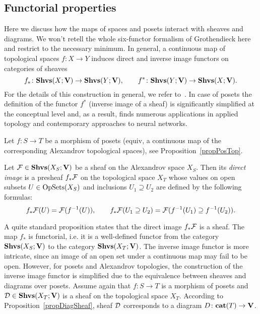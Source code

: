 
\subsection{Functorial properties}\label{subsecMathFunctorial}

Here we discuss how the maps of spaces and posets interact with sheaves and diagrams. We won't retell the whole six-functor formalism of Grothendieck here and restrict to the necessary minimum. In general, a continuous map of topological spaces $f\colon X\to Y$ induces direct and inverse image functors on categories of sheaves
\[
f_*\colon \mathbf{Shvs}(X;\mathbf{V})\to \mathbf{Shvs}(Y;\mathbf{V}), \qquad f^*\colon \mathbf{Shvs}(Y;\mathbf{V})\to \mathbf{Shvs}(X;\mathbf{V}).
\]
For the details of this construction in general, we refer to~\cite{Iversen}. In case of posets the definition of the functor $f^*$ (inverse image of a sheaf) is significantly simplified at the conceptual level and, as a result, finds numerous applications in applied topology and contemporary approaches to neural networks.

Let $f\colon S\to T$ be a morphism of posets (equiv, a continuous map of the corresponding Alexandrov topological spaces), see Proposition~\ref{propPosTop}.

\begin{defin}\label{defDirectImage}
Let $\mathcal{F}\in\mathbf{Shvs}(X_S;\mathbf{V})$ be a sheaf on the Alexandrov space $X_S$. Then its \emph{direct image} is a presheaf $f_*\mathcal{F}$ on the topological space $X_T$ whose values on open subsets $U\in\operatorname{OpSets}(X_S)$ and inclusions $U_1\supseteq U_2$ are defined by the following formulas:
\[
f_*\mathcal{F}(U)=\mathcal{F}(f^{-1}(U)),\qquad f_*\mathcal{F}(U_1\supseteq U_2)=\mathcal{F}(f^{-1}(U_1)\supseteq f^{-1}(U_2)).
\]
\end{defin}

A quite standard proposition states that the direct image $f_*\mathcal{F}$ is a sheaf. The map $f_*$ is functorial, i.e. it is a well-defined functor from the category $\mathbf{Shvs}(X_S;\mathbf{V})$ to the category $\mathbf{Shvs}(X_T;\mathbf{V})$. The inverse image functor is more intricate, since an image of an open set under a continuous map may fail to be open. However, for posets and Alexandrov topologies, the construction of the inverse image functor is simplified due to the equivalence between sheaves and diagrams over posets. Assume again that $f\colon S\to T$ is a morphism of posets and $\mathcal{D}\in\mathbf{Shvs}(X_T;\mathbf{V})$ is a sheaf on the topological space $X_T$. According to Proposition~\ref{propDiagSheaf}, sheaf $\mathcal{D}$ corresponds to a diagram $D\colon \mathbf{cat}(T)\to\mathbf{V}$.


